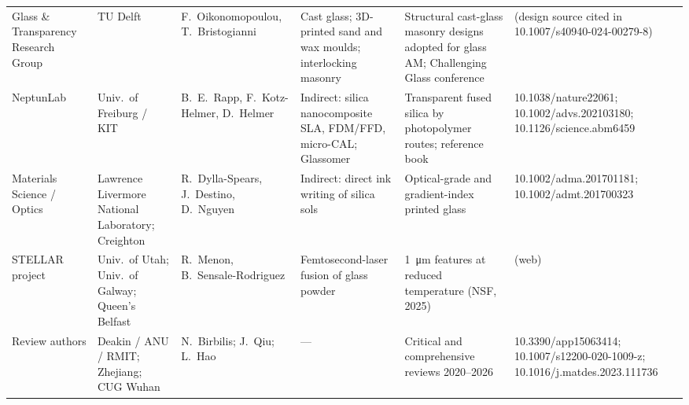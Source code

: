 \begin{table}
\begin{tabular}{@{}L{2.9cm}L{2.5cm}L{2.8cm}L{2.9cm}L{4.2cm}L{4.2cm}@{}}
    \midrule
    Glass \& Transparency Research Group & TU Delft & F.\ Oikonomopoulou, T.\ Bristogianni & Cast glass; 3D-printed sand and wax moulds; interlocking masonry & Structural cast-glass masonry designs adopted for glass AM; Challenging Glass conference & (design source cited in 10.1007/s40940-024-00279-8)\\
    NeptunLab & Univ.\ of Freiburg / KIT & B.\ E.\ Rapp, F.\ Kotz-Helmer, D.\ Helmer & Indirect: silica nanocomposite SLA, FDM/FFD, micro-CAL; Glassomer & Transparent fused silica by photopolymer routes; reference book & 10.1038/nature22061; 10.1002/advs.202103180; 10.1126/science.abm6459\\
    Materials Science / Optics & Lawrence Livermore National Laboratory; Creighton & R.\ Dylla-Spears, J.\ Destino, D.\ Nguyen & Indirect: direct ink writing of silica sols & Optical-grade and gradient-index printed glass & 10.1002/adma.201701181; 10.1002/admt.201700323\\
    STELLAR project & Univ.\ of Utah; Univ.\ of Galway; Queen's Belfast & R.\ Menon, B.\ Sensale-Rodriguez & Femtosecond-laser fusion of glass powder & \SI{1}{\micro\metre} features at reduced temperature (NSF, 2025) & (web) \\
    Review authors & Deakin / ANU / RMIT; Zhejiang; CUG Wuhan & N.\ Birbilis; J.\ Qiu; L.\ Hao & --- & Critical and comprehensive reviews 2020--2026 & 10.3390/app15063414; 10.1007/s12200-020-1009-z; 10.1016/j.matdes.2023.111736\\
    \bottomrule
  \end{tabular}
\end{table}
